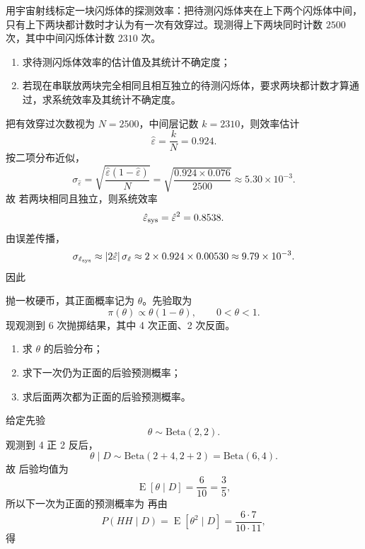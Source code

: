 \begin{question}
用宇宙射线标定一块闪烁体的探测效率：把待测闪烁体夹在上下两个闪烁体中间，只有上下两块都计数时才认为有一次有效穿过。现测得上下两块同时计数 $2500$ 次，其中中间闪烁体计数 $2310$ 次。
\begin{enumerate}[label=(\alph*),leftmargin=2.8em,itemsep=0.2em]
\item 求待测闪烁体效率的估计值及其统计不确定度；
\item 若现在串联放两块完全相同且相互独立的待测闪烁体，要求两块都计数才算通过，求系统效率及其统计不确定度。
\end{enumerate}
\begin{solution}
把有效穿过次数视为 $N=2500$，中间层记数 $k=2310$，则效率估计
\[
\hat\varepsilon=\frac{k}{N}=0.924.
\]
按二项分布近似，
\[
\sigma_{\hat\varepsilon}
=\sqrt{\frac{\hat\varepsilon(1-\hat\varepsilon)}{N}}
=\sqrt{\frac{0.924\times 0.076}{2500}}
\approx 5.30\times 10^{-3}.
\]
故
若两块相同且独立，则系统效率
\[
\hat\varepsilon_{\rm sys}=\hat\varepsilon^2=0.8538.
\]
由误差传播，
\[
\sigma_{\hat\varepsilon_{\rm sys}}
\approx \left|2\hat\varepsilon\right|\sigma_{\hat\varepsilon}
\approx 2\times 0.924\times 0.00530
\approx 9.79\times 10^{-3}.
\]
因此
\end{solution}
\end{question}

\begin{question}
抛一枚硬币，其正面概率记为 $\theta$。先验取为
\[
\pi(\theta)\propto \theta(1-\theta),\qquad 0<\theta<1.
\]
现观测到 6 次抛掷结果，其中 4 次正面、2 次反面。
\begin{enumerate}[label=(\alph*),leftmargin=2.8em,itemsep=0.2em]
\item 求 $\theta$ 的后验分布；
\item 求下一次仍为正面的后验预测概率；
\item 求后面两次都为正面的后验预测概率。
\end{enumerate}
\begin{solution}
给定先验
\[
\theta\sim \mathrm{Beta}(2,2).
\]
观测到 4 正 2 反后，
\[
\theta\mid D\sim \mathrm{Beta}(2+4,2+2)=\mathrm{Beta}(6,4).
\]
故
后验均值为
\[
\operatorname{E}[\theta\mid D]=\frac{6}{10}=\frac35,
\]
所以下一次为正面的预测概率为
再由
\[
P(HH\mid D)=\operatorname{E}[\theta^2\mid D]
=\frac{6\cdot 7}{10\cdot 11},
\]
得
\end{solution}
\end{question}

